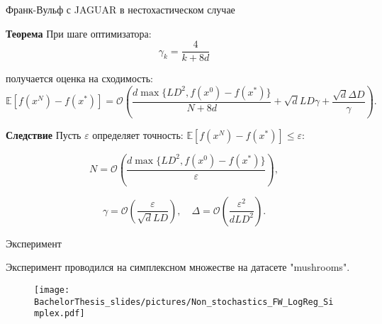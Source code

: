 \documentclass{beamer}
\newcommand{\expect}[1]{\mathbb{E}\left[ #1 \right]}
\newcommand{\norms}[1]{\left\| #1 \right\|}
\begin{document}
    
        


\begin{frame}{Франк-Вульф с JAGUAR в нестохастическом случае}

    \textbf{Теорема}
        При шаге оптимизатора:
        \begin{equation*}
            \gamma_k = \frac{4}{k + 8d}
        \end{equation*}
            
        получается оценка на сходимость:
        \small{
            \begin{equation*}
                \mathbb{E}\left[f(x^{N}) - f(x^*)\right] = \mathcal{O} \left( \frac{d \max\{L D^2, f(x^0) - f(x^*)\}}{N + 8d} + \sqrt{d} L D \gamma + \frac{\sqrt{d} \Delta D}{\gamma}\right).
            \end{equation*}
        }

    \textbf{Следствие} Пусть $\varepsilon$ определяет точность: $\expect{f(x^N) - f(x^*)} \leq \varepsilon$:

        \begin{equation*}
            N = \mathcal{O} \left( \frac{d \max\{L D^2, f(x^0) - f(x^*)\}}{\varepsilon} \right),
        \end{equation*}
        
        \begin{equation*}
            \gamma = \mathcal{O} \left(\frac{\varepsilon}{\sqrt{d} L D} \right), \quad
            \Delta = \mathcal{O} \left( \frac{\varepsilon^2}{d L D^2}\right).
         \end{equation*}

\end{frame}


\begin{frame}{Эксперимент}

    Эксперимент проводился на симплексном множестве на датасете "mushrooms".

    \begin{figure}
        \centering
        \texttt{[image: BachelorThesis\_slides/pictures/Non\_stochastics\_FW\_LogReg\_Simplex.pdf]}
    \end{figure}

\end{frame}
\end{document}
